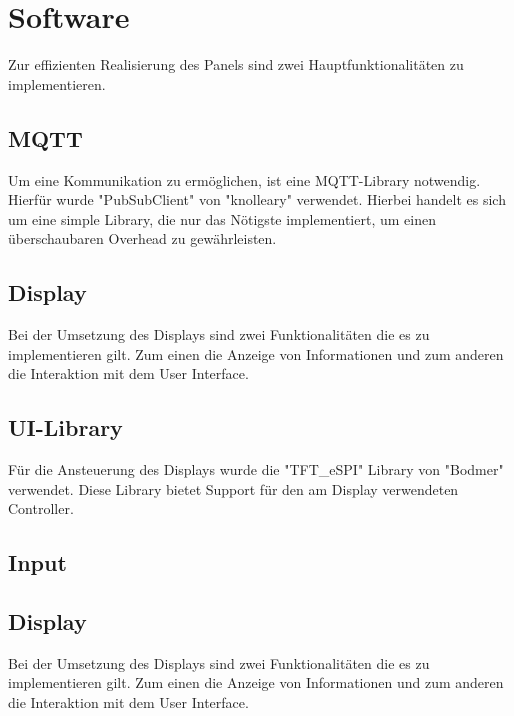         \section{Software}
        Zur effizienten Realisierung des Panels sind zwei 
        Hauptfunktionalitäten zu implementieren.

            \subsection{MQTT}
                Um eine Kommunikation zu ermöglichen, ist eine 
                MQTT-Library notwendig. Hierfür wurde "PubSubClient" von 
                "knolleary" verwendet. Hierbei handelt es sich um eine 
                simple Library, die nur das Nötigste implementiert, um
                einen überschaubaren Overhead zu gewährleisten.
            \subsection{Display}
                Bei der Umsetzung des Displays sind zwei Funktionalitäten
                die es zu implementieren gilt. Zum einen die Anzeige von
                Informationen und zum anderen die Interaktion mit dem
                User Interface. 
                \subsection{UI-Library}
                    Für die Ansteuerung des Displays wurde die "TFT\_eSPI"
                    \space Library von "Bodmer" verwendet. Diese Library bietet
                    Support für den am Display verwendeten Controller.
                \subsection{Input}
                \subsection{Display}
                    Bei der Umsetzung des Displays sind zwei Funktionalitäten
                    die es zu implementieren gilt. Zum einen die Anzeige von
                    Informationen und zum anderen die Interaktion mit dem
                    User Interface. 
        